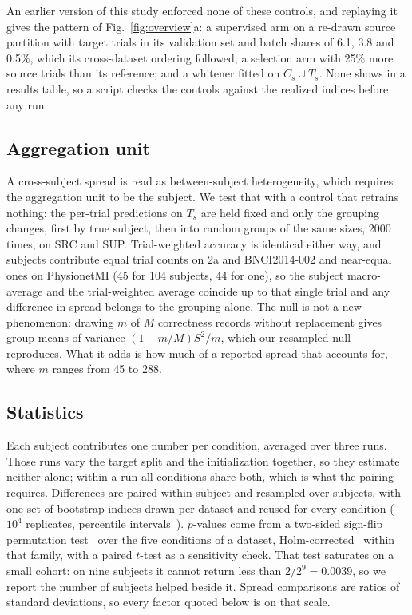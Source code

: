 An earlier version of this study enforced none of these controls, and replaying it gives the pattern of Fig.~\ref{fig:overview}a: a supervised arm on a re-drawn source partition with target trials in its validation set and batch shares of 6.1, 3.8 and 0.5\%, which its cross-dataset ordering followed; a selection arm with 25\% more source trials than its reference; and a whitener fitted on $C_s \cup T_s$. None shows in a results table, so a script checks the controls against the realized indices before any run.

\subsection{Aggregation unit}
\label{sec:aggregation}
A cross-subject spread is read as between-subject heterogeneity, which requires the aggregation unit to be the subject. We test that with a control that retrains nothing: the per-trial predictions on $T_s$ are held fixed and only the grouping changes, first by true subject, then into random groups of the same sizes, 2000 times, on SRC and SUP. Trial-weighted accuracy is identical either way, and subjects contribute equal trial counts on 2a and BNCI2014-002 and near-equal ones on PhysionetMI (45 for 104 subjects, 44 for one), so the subject macro-average and the trial-weighted average coincide up to that single trial and any difference in spread belongs to the grouping alone. The null is not a new phenomenon: drawing $m$ of $M$ correctness records without replacement gives group means of variance $(1-m/M)S^2/m$, which our resampled null reproduces. What it adds is how much of a reported spread that accounts for, where $m$ ranges from 45 to 288.

\subsection{Statistics}
\label{sec:stats}
Each subject contributes one number per condition, averaged over three runs. Those runs vary the target split and the initialization together, so they estimate neither alone; within a run all conditions share both, which is what the pairing requires. Differences are paired within subject and resampled over subjects, with one set of bootstrap indices drawn per dataset and reused for every condition ($10^4$ replicates, percentile intervals~\cite{efron1994bootstrap}). $p$-values come from a two-sided sign-flip permutation test~\cite{winkler2014permutation} over the five conditions of a dataset, Holm-corrected~\cite{holm1979simple} within that family, with a paired $t$-test as a sensitivity check. That test saturates on a small cohort: on nine subjects it cannot return less than $2/2^{9}=0.0039$, so we report the number of subjects helped beside it. Spread comparisons are ratios of standard deviations, so every factor quoted below is on that scale.

